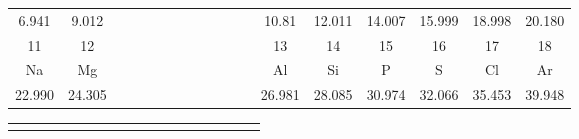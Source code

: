\documentclass[10pt,landscape]{article}
\begin{document}
\begin{center}
\begin{tabular}{|c|c|p{17.8mm}*{9}{p{8.98mm}}|c|c|c|c|c|c|}
        \small 6.941                               & \small 9.012\hspace{0.5mm}                  &  &  &  &  &  &  &  &  &  &  & \small 10.81                               & \small 12.011                               & \small 14.007                             & \small 15.999 & \small 18.998                             & \small 20.180 \\[-1mm]\cline{1-2}\cline{13-18}
        \small 11                                  & \small 12                                   &  &  &  &  &  &  &  &  &  &  & \small 13                                  & \small 14                                   & \small 15                                 & \small 16     & \small 17                                 & \small 18     \\[-1mm]
        Na                                         & Mg                                          &  &  &  &  &  &  &  &  &  &  & Al                                         & Si                                          & P                                         & S             & Cl                                        & Ar            \\[-2mm]
        \small \hspace{0.75mm}22.990\hspace{0.8mm} & \small \hspace{0.83mm}24.305\hspace{0.83mm} &  &  &  &  &  &  &  &  &  &  & \small \hspace{0.8mm}26.981\hspace{0.78mm} & \small \hspace{0.95mm}28.085\hspace{0.73mm} & \small \hspace{0.8mm}30.974\hspace{0.8mm} & \small 32.066 & \small \hspace{0.8mm}35.453\hspace{0.8mm} & \small 39.948 \\
        \hline
    \end{tabular}
    \vspace{-3mm}
    \begin{tabular}{|c*{16}{|c}|c|}
                       &                &                &               &                &               &                &               &                &               &                &               &                &                &                &               &                &                                   \\[-6.8mm]

\end{tabular}
\end{center}
\end{document}

